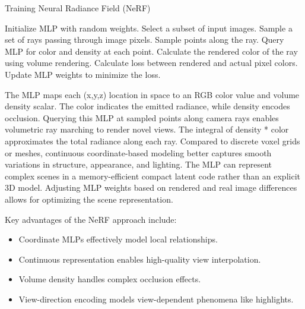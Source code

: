 \vspace{10pt}

\begin{algorithm}
\caption{Training Neural Radiance Field (NeRF)}
\begin{algorithmic}[1]
\STATE Initialize MLP with random weights.
    \STATE Select a subset of input images.
        \STATE Sample a set of rays passing through image pixels.
            \STATE Sample points along the ray.
            \STATE Query MLP for color and density at each point.
            \STATE Calculate the rendered color of the ray using volume rendering.
        \ENDFOR
        \STATE Calculate loss between rendered and actual pixel colors.
        \STATE Update MLP weights to minimize the loss.
    \ENDFOR
\ENDFOR
\end{algorithmic}
\end{algorithm}
\vspace{10pt}

    
The MLP maps each (x,y,z) location in space to an RGB color value and volume density scalar. The color indicates the emitted radiance, while density encodes occlusion. Querying this MLP at sampled points along camera rays enables volumetric ray marching to render novel views. The integral of density * color approximates the total radiance along each ray.
Compared to discrete voxel grids or meshes, continuous coordinate-based modeling better captures smooth variations in structure, appearance, and lighting. The MLP can represent complex scenes in a memory-efficient compact latent code rather than an explicit 3D model. Adjusting MLP weights based on rendered and real image differences allows for optimizing the scene representation.
\vspace{10pt}

\clearpage
Key advantages of the NeRF approach include:
\begin{itemize}
 \item Coordinate MLPs effectively model local relationships.
 \item Continuous representation enables high-quality view interpolation.
 \item Volume density handles complex occlusion effects.
 \item View-direction encoding models view-dependent phenomena like highlights.
\end{itemize}
\vspace{10pt}



